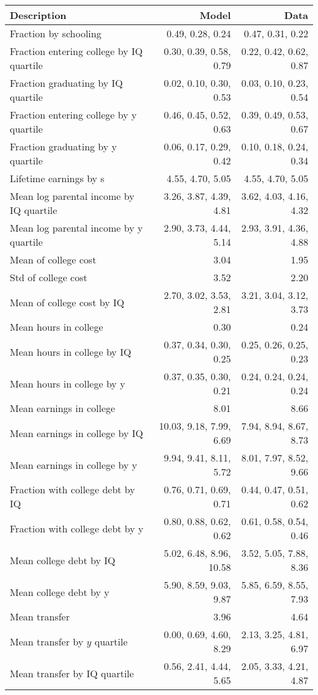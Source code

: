 \begin{tabular}{lrr}
\hline
Description & Model  & Data  \\
\hline
Fraction by schooling & 0.49, 0.28, 0.24  & 0.47, 0.31, 0.22  \\
Fraction entering college by IQ quartile & 0.30, 0.39, 0.58, 0.79  & 0.22, 0.42, 0.62, 0.87  \\
Fraction graduating by IQ quartile & 0.02, 0.10, 0.30, 0.53  & 0.03, 0.10, 0.23, 0.54  \\
Fraction entering college by y quartile & 0.46, 0.45, 0.52, 0.63  & 0.39, 0.49, 0.53, 0.67  \\
Fraction graduating by y quartile & 0.06, 0.17, 0.29, 0.42  & 0.10, 0.18, 0.24, 0.34  \\
Lifetime earnings by s & 4.55, 4.70, 5.05  & 4.55, 4.70, 5.05  \\
Mean log parental income by IQ quartile & 3.26, 3.87, 4.39, 4.81  & 3.62, 4.03, 4.16, 4.32  \\
Mean log parental income by y quartile & 2.90, 3.73, 4.44, 5.14  & 2.93, 3.91, 4.36, 4.88  \\
Mean of college cost & 3.04  & 1.95  \\
Std of college cost & 3.52  & 2.20  \\
Mean of college cost by IQ & 2.70, 3.02, 3.53, 2.81  & 3.21, 3.04, 3.12, 3.73  \\
Mean hours in college & 0.30  & 0.24  \\
Mean hours in college by IQ & 0.37, 0.34, 0.30, 0.25  & 0.25, 0.26, 0.25, 0.23  \\
Mean hours in college by y & 0.37, 0.35, 0.30, 0.21  & 0.24, 0.24, 0.24, 0.24  \\
Mean earnings in college & 8.01  & 8.66  \\
Mean earnings in college by IQ & 10.03, 9.18, 7.99, 6.69  & 7.94, 8.94, 8.67, 8.73  \\
Mean earnings in college by y & 9.94, 9.41, 8.11, 5.72  & 8.01, 7.97, 8.52, 9.66  \\
Fraction with college debt by IQ & 0.76, 0.71, 0.69, 0.71  & 0.44, 0.47, 0.51, 0.62  \\
Fraction with college debt by y & 0.80, 0.88, 0.62, 0.62  & 0.61, 0.58, 0.54, 0.46  \\
Mean college debt by IQ & 5.02, 6.48, 8.96, 10.58  & 3.52, 5.05, 7.88, 8.36  \\
Mean college debt by y & 5.90, 8.59, 9.03, 9.87  & 5.85, 6.59, 8.55, 7.93  \\
Mean transfer & 3.96  & 4.64  \\
Mean transfer by $y$ quartile & 0.00, 0.69, 4.60, 8.29  & 2.13, 3.25, 4.81, 6.97  \\
Mean transfer by IQ quartile & 0.56, 2.41, 4.44, 5.65  & 2.05, 3.33, 4.21, 4.87  \\
\hline
\end{tabular}%
